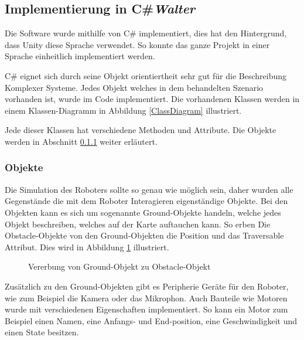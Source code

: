 \subsection{Implementierung in C\#\hfill\textnormal{\emph{Walter}}}
Die Software wurde mithilfe von C\# implementiert, dies hat den Hintergrund, dass Unity diese Sprache verwendet. So konnte das ganze Projekt in einer Sprache einheitlich implementiert werden. 

C\# eignet sich durch seine Objekt orientiertheit sehr gut für die Beschreibung Komplexer Systeme. Jedes Objekt welches in dem behandelten Szenario vorhanden ist, wurde im Code implementiert. Die vorhandenen Klassen werden in einem Klassen-Diagramm in Abbildung \ref{ClassDiagram} illustriert.

Jede dieser Klassen hat verschiedene Methoden und Attribute. Die Objekte werden in Abschnitt \ref{obj} weiter erläutert. 

\subsubsection{Objekte}
\label{obj}
Die Simulation des Roboters sollte so genau wie möglich sein, daher wurden alle Gegenstände die mit dem Roboter Interagieren eigenständige Objekte. Bei den Objekten kann es sich um sogenannte Ground-Objekte handeln, welche jedes Objekt beschreiben, welches auf der Karte auftauchen kann. So erben Die Obstacle-Objekte von den Ground-Objekten die Position und das Traversable Attribut. Dies wird in Abbildung \ref{erben} illustriert. 

\begin{figure}[H]
  \caption{Vererbung von Ground-Objekt zu Obstacle-Objekt}
  \label{erben}
\end{figure}
Zusätzlich zu den Ground-Objekten gibt es Peripherie Geräte für den Roboter, wie zum Beispiel die Kamera oder das Mikrophon. Auch Bauteile wie Motoren wurde mit verschiedenen Eigenschaften implementiert. So kann ein Motor zum Beispiel einen Namen, eine Anfangs- und End-position, eine Geschwindigkeit und einen State besitzen.

